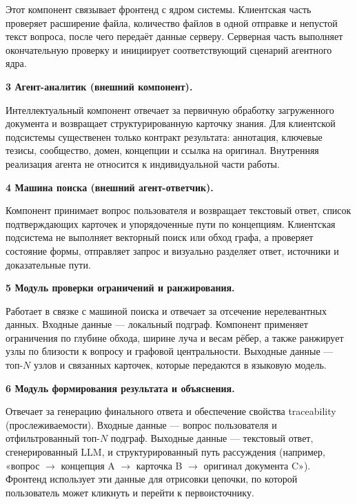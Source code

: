 Этот компонент связывает фронтенд с ядром системы. Клиентская часть проверяет расширение файла, количество файлов в одной отправке и непустой текст вопроса, после чего передаёт данные серверу. Серверная часть выполняет окончательную проверку и инициирует соответствующий сценарий агентного ядра.

\vspace{0.5em}
\textbf{3 Агент-аналитик (внешний компонент).}

Интеллектуальный компонент отвечает за первичную обработку загруженного документа и возвращает структурированную карточку знания. Для клиентской подсистемы существенен только контракт результата: аннотация, ключевые тезисы, сообщество, домен, концепции и ссылка на оригинал. Внутренняя реализация агента не относится к индивидуальной части работы.

\vspace{0.5em}
\textbf{4 Машина поиска (внешний агент-ответчик).}

Компонент принимает вопрос пользователя и возвращает текстовый ответ, список подтверждающих карточек и упорядоченные пути по концепциям. Клиентская подсистема не выполняет векторный поиск или обход графа, а проверяет состояние формы, отправляет запрос и визуально разделяет ответ, источники и доказательные пути.

\vspace{0.5em}
\textbf{5 Модуль проверки ограничений и ранжирования.}

Работает в связке с машиной поиска и отвечает за отсечение нерелевантных данных. Входные данные — локальный подграф. Компонент применяет ограничения по глубине обхода, ширине луча и весам рёбер, а также ранжирует узлы по близости к вопросу и графовой центральности. Выходные данные — топ-$N$ узлов и связанных карточек, которые передаются в языковую модель.

\vspace{0.5em}
\textbf{6 Модуль формирования результата и объяснения.}

Отвечает за генерацию финального ответа и обеспечение свойства traceability (прослеживаемости). Входные данные — вопрос пользователя и отфильтрованный топ-$N$ подграф. Выходные данные — текстовый ответ, сгенерированный LLM, и структурированный путь рассуждения (например, «вопрос $\rightarrow$ концепция A $\rightarrow$ карточка B $\rightarrow$ оригинал документа C»). Фронтенд использует эти данные для отрисовки цепочки, по которой пользователь может кликнуть и перейти к первоисточнику.

